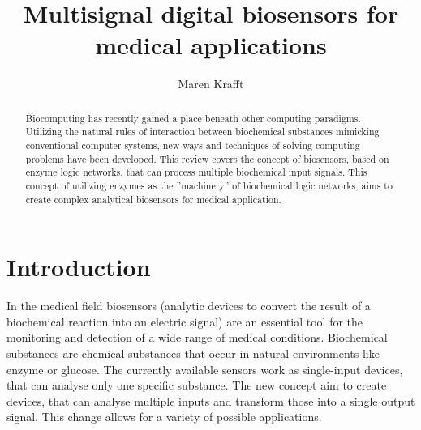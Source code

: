 \documentclass[runningheads]{llncs}
\begin{document}
\title{Multisignal digital biosensors for medical applications}
\author{Maren Krafft}
\maketitle        

      
\begin{abstract}
Biocomputing has recently gained a place beneath other computing paradigms. Utilizing the natural rules of interaction between biochemical substances mimicking conventional computer systems, new ways and techniques of solving computing problems have been developed. This review covers the concept of biosensors, based on enzyme logic networks, that can process multiple biochemical input signals. This concept of utilizing enzymes as the ''machinery'' of biochemical logic networks, aims to create complex analytical biosensors for medical application.


\end{abstract}


\section{Introduction}

	In the medical field biosensors (analytic devices to convert the result of a biochemical reaction into an electric signal) are an essential tool for the monitoring and detection of a wide range of medical conditions. Biochemical substances are chemical substances that occur in natural environments like enzyme or glucose. The currently available sensors work as single-input devices, that can analyse only one specific substance. The new concept aim to create devices, that can analyse multiple inputs and transform those into a single output signal. This change allows for a variety of possible applications. \cite{biosensors,definitions}\\
	
\end{document}
